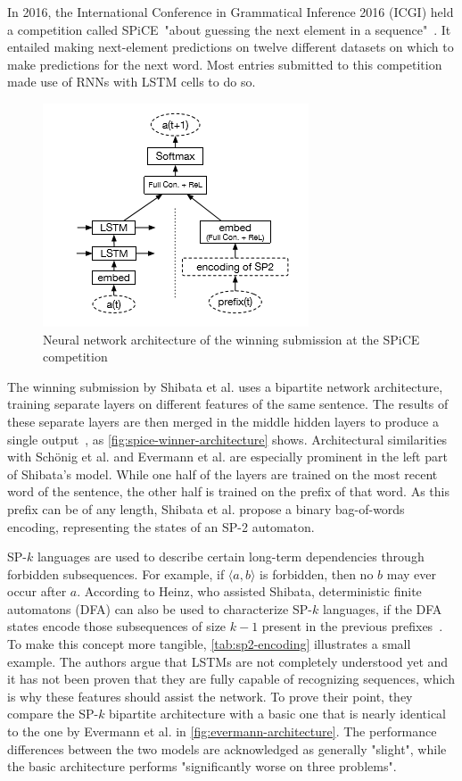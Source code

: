 In 2016, the International Conference in Grammatical Inference 2016 (ICGI) held a competition called SPiCE\ "about guessing the next element in a sequence"~\cite{web:spice}. It entailed making next-element predictions on twelve different datasets on which to make predictions for the next word. Most entries submitted to this competition made use of RNNs with LSTM cells to do so.\\

\begin{figure}
    \centering
    \includegraphics[height=.4\textwidth]{gfx/spice-winner-architecture.png}
    \caption{Neural network architecture of the winning submission at the SPiCE competition~\cite{shibata2016bipartite}}
    \label{fig:spice-winner-architecture}
\end{figure}

The winning submission by Shibata et al. uses a bipartite network architecture, training separate layers on different features of the same sentence. The results of these separate layers are then merged in the middle hidden layers to produce a single output~\cite{shibata2016bipartite}, as \autoref{fig:spice-winner-architecture} shows. Architectural similarities with Schönig et al. and Evermann et al. are especially prominent in the left part of Shibata's model.
While one half of the layers are trained on the most recent word of the sentence, the other half is trained on the prefix of that word. As this prefix can be of any length, Shibata et al. propose a binary bag-of-words encoding, representing the states of an SP-2 automaton.

SP-$k$ languages are used to describe certain long-term dependencies through forbidden subsequences. For example, if $\langle a,b \rangle$ is forbidden, then no $b$ may ever occur after $a$. According to Heinz, who assisted Shibata, deterministic finite automatons (DFA) can also be used to characterize SP-$k$ languages, if the DFA states encode those subsequences of size $k-1$ present in the previous prefixes~\cite{heinz2010estimatingSP}. To make this concept more tangible, \autoref{tab:sp2-encoding} illustrates a small example. The authors argue that LSTMs are not completely understood yet and it has not been proven that they are fully capable of recognizing sequences, which is why these features should assist the network. To prove their point, they compare the SP-$k$ bipartite architecture with a basic one that is nearly identical to the one by Evermann et al. in \autoref{fig:evermann-architecture}. The performance differences between the two models are acknowledged as generally "slight", while the basic architecture performs "significantly worse on three problems".\\

